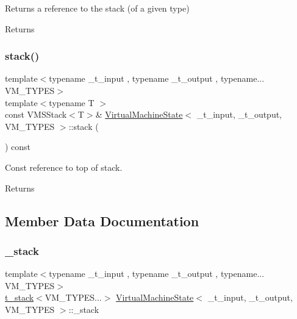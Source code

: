Returns a reference to the stack (of a given type) 

\begin{DoxyReturn}{Returns}

\end{DoxyReturn}
\mbox{\label{class_virtual_machine_state_adc77f615f164e83ee4a25f06b3a5b64d}} 
\subsubsection{\texorpdfstring{stack()}{stack()}\hspace{0.1cm}{\footnotesize\ttfamily [2/2]}}
{\footnotesize\ttfamily template$<$typename \+\_\+t\+\_\+input , typename \+\_\+t\+\_\+output , typename... V\+M\+\_\+\+T\+Y\+P\+ES$>$ \\
template$<$typename T $>$ \\
const V\+M\+S\+Stack$<$T$>$\& \hyperlink{class_virtual_machine_state}{Virtual\+Machine\+State}$<$ \+\_\+t\+\_\+input, \+\_\+t\+\_\+output, V\+M\+\_\+\+T\+Y\+P\+ES $>$\+::stack (\begin{DoxyParamCaption}{ }\end{DoxyParamCaption}) const\hspace{0.3cm}{\ttfamily [inline]}}



Const reference to top of stack. 

\begin{DoxyReturn}{Returns}

\end{DoxyReturn}


\subsection{Member Data Documentation}
\mbox{\label{class_virtual_machine_state_a55e2a8e32597a15740e9e38ae539200c}} 
\subsubsection{\texorpdfstring{\+\_\+stack}{\_stack}}
{\footnotesize\ttfamily template$<$typename \+\_\+t\+\_\+input , typename \+\_\+t\+\_\+output , typename... V\+M\+\_\+\+T\+Y\+P\+ES$>$ \\
\hyperlink{struct_virtual_machine_state_1_1t__stack}{t\+\_\+stack}$<$V\+M\+\_\+\+T\+Y\+P\+E\+S...$>$ \hyperlink{class_virtual_machine_state}{Virtual\+Machine\+State}$<$ \+\_\+t\+\_\+input, \+\_\+t\+\_\+output, V\+M\+\_\+\+T\+Y\+P\+ES $>$\+::\+\_\+stack}

